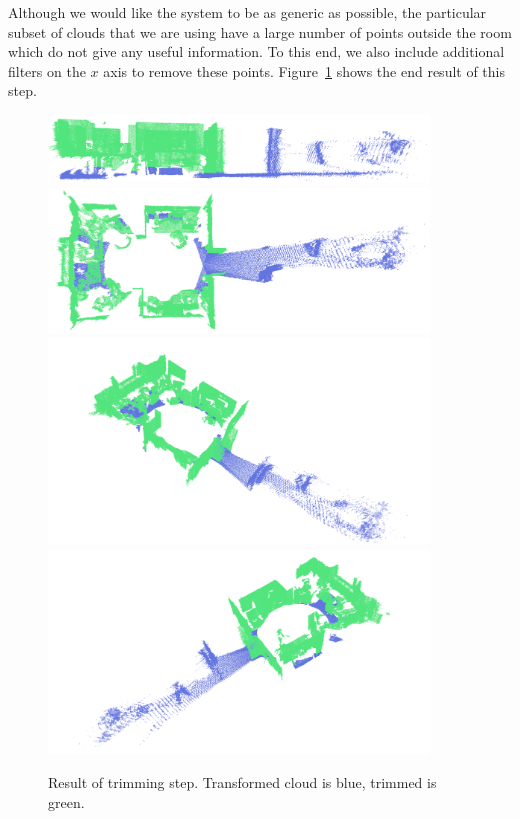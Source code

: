 \documentclass[11pt,a4paper]{kth-mag}
\begin{document}
Although we would like the system to be as generic as possible, the particular
subset of clouds that we are using have a large number of points outside the
room which do not give any useful information. To this end, we also include
additional filters on the $x$ axis to remove these points.
Figure~\ref{fig:trimmed} shows the end result of this step.

\begin{figure}
  \centering
  \includegraphics[width=0.9\textwidth]{images/trimmed_side}
  \includegraphics[width=0.9\textwidth]{images/trimmed_top}
  \includegraphics[width=0.9\textwidth]{images/trimmed_diag_left}
  \includegraphics[width=0.9\textwidth]{images/trimmed_diag_right}
  \caption{Result of trimming step. Transformed cloud is blue, trimmed is green.}
  \label{fig:trimmed}
\end{figure}
\end{document}
